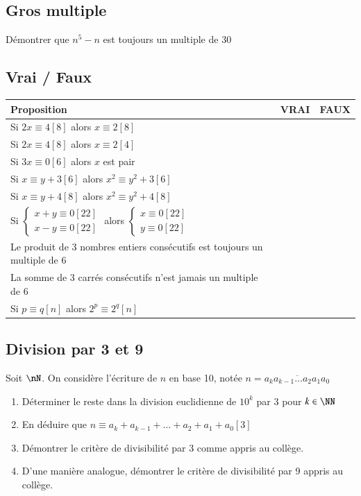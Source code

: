 \documentclass[oneside,12pt]{article}          %
\begin{document}
\subsection{Gros multiple}
Démontrer que $n^5-n$ est toujours un multiple de 30



\subsection{Vrai / Faux}
\begin{center}
\renewcommand{\arraystretch}{1.7}
\begin{tabular}{|p{}|p{1.5cm}|p{1.5cm}|} \hline
    \centering Proposition & VRAI & FAUX \\ \hline
    \centering Si $2x\equiv4 [8]$ alors $x\equiv2 [8]$ & & \\ \hline
    \centering Si $2x\equiv4 [8]$ alors $x\equiv2 [4]$ & & \\ \hline
    \centering Si $3x\equiv0 [6]$ alors $x$ est pair & & \\ \hline
    \centering Si $x\equiv y+3 [6]$ alors $x^2\equiv y^2+3 [6]$ & & \\ \hline
    \centering Si $x\equiv y+4 [8]$ alors $x^2\equiv y^2+4 [8]$ & & \\ \hline
    \centering Si $\begin{cases}x+y\equiv 0 [22] \\ x-y\equiv 0 [22]\end{cases}$ alors $\begin{cases}x\equiv0[22] \\ y\equiv0 [22]\end{cases}$ & & \\ \hline
    \centering Le produit de 3 nombres entiers consécutifs est toujours un multiple de 6 & & \\ \hline
    \centering La somme de 3 carrés consécutifs n'est jamais un multiple de 6 & & \\ \hline
    \centering Si $p\equiv q[n]$ alors $2^p\equiv 2^q[n]$ & & \\ \hline
\end{tabular}
\end{center}



\subsection{Division par 3 et 9}
Soit $\nN$. On considère l'écriture de $n$ en base 10, notée $n=\overline{a_ka_{k-1}\ldots a_2a_1a_0}$
\begin{enumerate}
    \item Déterminer le reste dans la division euclidienne de $10^k$ par 3 pour $k\in\NN$
    \item En déduire que $n\equiv a_k+a_{k-1}+\ldots+a_2+a_1+a_0 [3]$
    \item Démontrer le critère de divisibilité par 3 comme appris au collège.
    \item D'une manière analogue, démontrer le critère de divisibilité par 9 appris au collège.
\end{enumerate}
\end{document}
